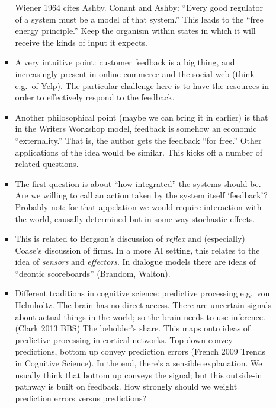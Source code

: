 \begin{mdframed}
\begin{enumerate}[start=4]
\begin{enumerate}
\begin{itemize}
  Wiener 1964 cites Ashby.  Conant and Ashby: ``Every good regulator
  of a system must be a model of that system.''  This leads to the
  ``free energy principle.''  Keep the organism within states in which
  it will receive the kinds of input it expects. 
\item A very intuitive point: customer feedback is a big thing, and
  increasingly present in online commerce and the social web (think
  e.g.~of Yelp).  The particular challenge here is to have the
  resources in order to effectively respond to the feedback.
\item Another philosophical point (maybe we can bring it in earlier)
  is that in the Writers Workshop model, feedback is somehow an
  economic ``externality.''  That is, the author gets the feedback
  ``for free.''  Other applications of the idea would be similar.
  This kicks off a number of related questions.
\item The first question is about ``how integrated'' the systems
  should be.  Are we willing to call an action taken by the system
  itself `feedback'?  Probably not: for that appelation we would
  require interaction with the world, causally determined but in some
  way stochastic effects.
\item This is related to Bergson's discussion of \emph{reflex} and
  (especially) Coase's discussion of firms.  In a more AI setting,
  this relates to the idea of \emph{sensors} and \emph{effectors}.  In
  dialogue models there are ideas of ``deontic scoreboards''
  (Brandom, Walton).
\item Different traditions in cognitive science: predictive processing
  e.g.~von Helmholtz.  The brain has no direct access.  There are
  uncertain signals about actual things in the world; so the brain
  needs to use inference.  (Clark 2013 BBS) The beholder's share.
  This maps onto ideas of predictive processing in cortical networks.
  Top down convey predictions, bottom up convey prediction errors
  (French 2009 Trends in Cognitive Science).  In the end, there's a
  sensible explanation.  We usually think that bottom up conveys the
  signal; but this outside-in pathway is built on feedback.  How
  strongly should we weight prediction errors versus predictions?
\end{itemize}
\end{enumerate}
\end{enumerate}
\end{mdframed}
